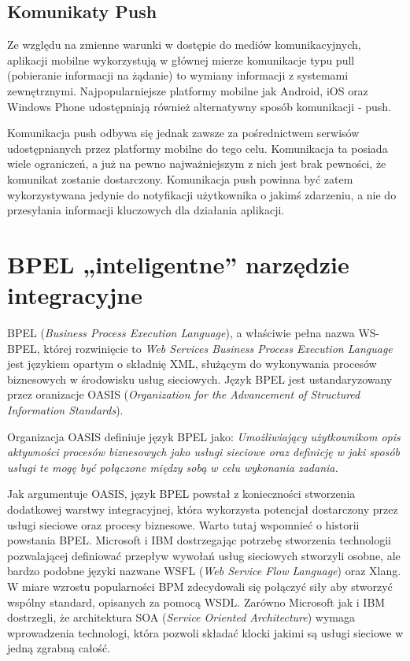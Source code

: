 \subsection{Komunikaty Push}
\label{sec:push}

Ze względu na zmienne warunki w dostępie do mediów komunikacyjnych, aplikacji mobilne wykorzystują w głównej mierze komunikacje typu pull (pobieranie informacji na żądanie) to wymiany informacji z systemami zewnętrznymi. Najpopularniejsze platformy mobilne jak Android, iOS oraz Windows Phone udostępniają również alternatywny sposób komunikacji - push. 

Komunikacja push odbywa się jednak zawsze za pośrednictwem serwisów udostępnianych przez platformy mobilne do tego celu. Komunikacja ta posiada wiele ograniczeń, a już na pewno najważniejszym z nich jest brak pewności, że komunikat zostanie dostarczony. Komunikacja push powinna być zatem wykorzystywana jedynie do notyfikacji użytkownika o jakimś zdarzeniu, a nie do przesyłania informacji kluczowych dla działania aplikacji. 


\section{BPEL „inteligentne” narzędzie integracyjne}
\label{sec:bpel}

BPEL (\textit{Business Process Execution Language}), a właściwie pełna nazwa WS-BPEL,  której rozwinięcie to \textit{Web Services Business Process Execution Language} jest językiem opartym o składnię XML, służącym do wykonywania procesów biznesowych w środowisku usług sieciowych. Język BPEL jest ustandaryzowany przez oranizacje OASIS (\textit{Organization for the Advancement of Structured Information Standards}). 

Organizacja OASIS definiuje język BPEL jako: \textit{Umożliwiający użytkownikom opis aktywności procesów biznesowych jako usługi sieciowe oraz definicję w jaki sposób usługi te mogę być połączone między sobą w celu wykonania zadania.} ~\cite{OASISweb}

Jak argumentuje OASIS, język BPEL powstał z konieczności stworzenia dodatkowej warstwy integracyjnej, która wykorzysta potencjał dostarczony przez usługi sieciowe oraz procesy biznesowe. Warto tutaj wspomnieć o historii powstania BPEL. Microsoft i IBM dostrzegając potrzebę stworzenia technologii pozwalającej definiować przepływ wywołań usług sieciowych stworzyli osobne, ale bardzo podobne języki nazwane WSFL (\textit{Web Service Flow Language}) oraz Xlang. W miare wzrostu popularności BPM zdecydowali się połączyć siły aby stworzyć wspólny standard, opisanych za pomocą WSDL. Zarówno Microsoft jak i IBM dostrzegli, że architektura SOA (\textit{Service Oriented Architecture}) wymaga wprowadzenia technologi, która pozwoli składać klocki jakimi są usługi sieciowe w jedną zgrabną całość.


